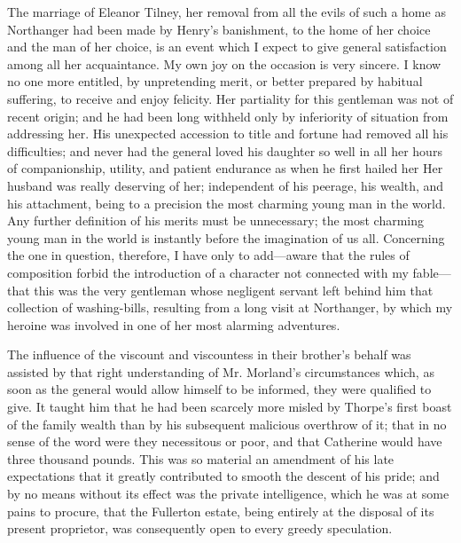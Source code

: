 The marriage of Eleanor Tilney, her removal from all the evils of such a home as Northanger had been made by Henry's banishment, to the home of her choice and the man of her choice, is an event which I expect to give general satisfaction among all her acquaintance. My own joy on the occasion is very sincere. I know no one more entitled, by unpretending merit, or better prepared by habitual suffering, to receive and enjoy felicity. Her partiality for this gentleman was not of recent origin; and he had been long withheld only by inferiority of situation from addressing her. His unexpected accession to title and fortune had removed all his difficulties; and never had the general loved his daughter so well in all her hours of companionship, utility, and patient endurance as when he first hailed her  Her husband was really deserving of her; independent of his peerage, his wealth, and his attachment, being to a precision the most charming young man in the world. Any further definition of his merits must be unnecessary; the most charming young man in the world is instantly before the imagination of us all. Concerning the one in question, therefore, I have only to add---aware that the rules of composition forbid the introduction of a character not connected with my fable---that this was the very gentleman whose negligent servant left behind him that collection of washing-bills, resulting from a long visit at Northanger, by which my heroine was involved in one of her most alarming adventures.

The influence of the viscount and viscountess in their brother's behalf was assisted by that right understanding of Mr. Morland's circumstances which, as soon as the general would allow himself to be informed, they were qualified to give. It taught him that he had been scarcely more misled by Thorpe's first boast of the family wealth than by his subsequent malicious overthrow of it; that in no sense of the word were they necessitous or poor, and that Catherine would have three thousand pounds. This was so material an amendment of his late expectations that it greatly contributed to smooth the descent of his pride; and by no means without its effect was the private intelligence, which he was at some pains to procure, that the Fullerton estate, being entirely at the disposal of its present proprietor, was consequently open to every greedy speculation.

